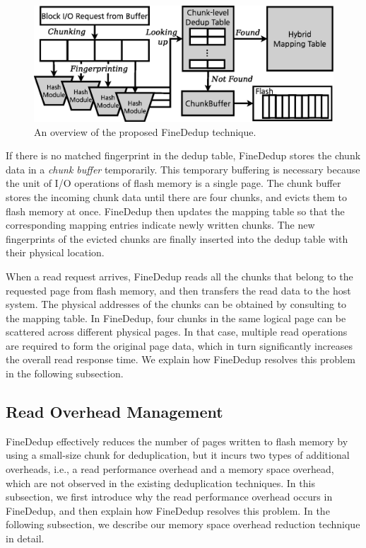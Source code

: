 \begin{figure}[t]
	\center
	\includegraphics[scale=0.4]{figure/finededup/overview}
	\caption{An overview of the proposed FineDedup technique.} %
	\label{fig:overview}
\end{figure}

If there is no matched fingerprint in the dedup table,
FineDedup stores the chunk data in a \textit{chunk buffer} temporarily.
This temporary buffering is necessary 
because the unit of I/O operations of flash memory is a single page.
The chunk buffer stores the incoming chunk data until there are four chunks,
and evicts them to flash memory at once.
FineDedup then updates the mapping table 
so that the corresponding mapping entries indicate newly written chunks.
The new fingerprints of the evicted chunks are finally inserted into the dedup table with their physical location.

When a read request arrives,
FineDedup reads all the chunks that belong to the requested page from flash memory,
and then transfers the read data to the host system.
The physical addresses of the chunks can be obtained by consulting to the mapping table.
In FineDedup, four chunks in the same logical page can be scattered across different physical pages.
In that case, multiple read operations are required to form the original page data,
which in turn significantly increases the overall read response time.
We explain how FineDedup resolves this problem in the following subsection.

\subsection{Read Overhead Management}

FineDedup effectively reduces the number of pages written to flash memory
by using a small-size chunk for deduplication,
but it incurs two types of additional overheads, i.e.,
a read performance overhead and a memory space overhead,
which are not observed in the existing deduplication techniques.
In this subsection, 
we first introduce why the read performance overhead occurs in FineDedup,
and then explain how FineDedup resolves this problem.
In the following subsection, 
we describe our memory space overhead reduction technique in detail.

